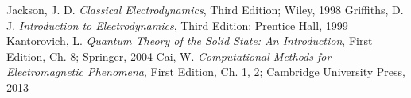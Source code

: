 \documentclass[12pt, notitlepage]{article}
\begin{document}
\pagebreak

\begin{thebibliography}{20}
Jackson, J. D. \textit{Classical Electrodynamics}, Third Edition; Wiley, 1998
Griffiths, D. J. \textit{Introduction to Electrodynamics}, Third Edition; Prentice Hall, 1999
Kantorovich, L. \textit{Quantum Theory of the Solid State: An Introduction}, First Edition, Ch. 8; Springer, 2004
Cai, W. \textit{Computational Methods for Electromagnetic Phenomena}, First Edition, Ch. 1, 2; Cambridge University Press, 2013
\end{thebibliography}


\end{document}

